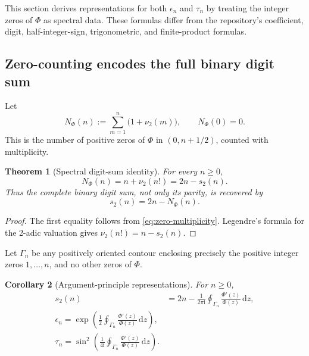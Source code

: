 \documentclass[11pt,oneside]{article}
\newtheorem{theorem}{Theorem}[section]
\newtheorem{corollary}[theorem]{Corollary}
\theoremstyle{definition}
\newcommand{\dd}{\,\mathrm d}
\newcommand{\ii}{\mathrm i}
\newcommand{\vTwo}{\nu_2}
\begin{document}
This section derives representations for both \(\epsilon_n\) and \(\tau_n\) by treating the
integer zeros of \(\Phi\) as spectral data. These formulas differ from the repository's
coefficient, digit, half-integer-sign, trigonometric, and finite-product formulas.

\subsection{Zero-counting encodes the full binary digit sum}

Let
\begin{equation}
 N_\Phi(n):=\sum_{m=1}^{n}\bigl(1+\vTwo(m)\bigr),\qquad N_\Phi(0)=0.
 \label{eq:Nphi-def}
\end{equation}
This is the number of positive zeros of \(\Phi\) in \((0,n+1/2)\), counted with multiplicity.

\begin{theorem}[Spectral digit-sum identity]
\label{thm:spectral-digit-sum}
For every \(n\ge0\),
\begin{equation}
 N_\Phi(n)=n+\vTwo(n!)=2n-s_2(n).
 \label{eq:Nphi-digit}
\end{equation}
Thus the complete binary digit sum, not only its parity, is recovered by
\begin{equation}
 \boxed{\displaystyle s_2(n)=2n-N_\Phi(n).}
 \label{eq:digit-from-spectrum}
\end{equation}
\end{theorem}

\begin{proof}
The first equality follows from \eqref{eq:zero-multiplicity}. Legendre's formula for the
2-adic valuation gives \(\vTwo(n!)=n-s_2(n)\).
\end{proof}

Let \(\Gamma_n\) be any positively oriented contour enclosing precisely the positive integer
zeros \(1,\ldots,n\), and no other zeros of \(\Phi\).

\begin{corollary}[Argument-principle representations]
\label{cor:argument-TM}
For \(n\ge0\),
\begin{align}
 s_2(n)
 &=2n-\frac{1}{2\pi\ii}\oint_{\Gamma_n}\frac{\Phi'(z)}{\Phi(z)}\dd z,
 \label{eq:digit-contour}\\
 \boxed{\displaystyle
 \epsilon_n=\exp\left(\frac12\oint_{\Gamma_n}
 \frac{\Phi'(z)}{\Phi(z)}\dd z\right),}
 \label{eq:epsilon-contour}\\
 \boxed{\displaystyle
 \tau_n=\sin^2\left(\frac{1}{4\ii}\oint_{\Gamma_n}
 \frac{\Phi'(z)}{\Phi(z)}\dd z\right).}
 \label{eq:tau-contour}
\end{align}
\end{corollary}
\end{document}
